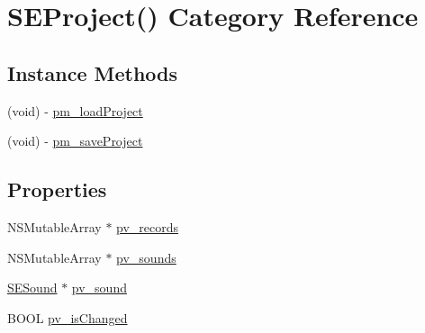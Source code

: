 \hypertarget{category_s_e_project_07_08}{\section{S\-E\-Project() Category Reference}
\label{category_s_e_project_07_08}
}
\subsection*{Instance Methods}
\begin{DoxyCompactItemize}
\item 
(void) -\/ \hyperlink{category_s_e_project_07_08_a2733629176d07d6e49be855ca64bc8e0}{pm\-\_\-load\-Project}
\item 
(void) -\/ \hyperlink{category_s_e_project_07_08_a2754dc82ffc8565940c2b297e638800e}{pm\-\_\-save\-Project}
\end{DoxyCompactItemize}
\subsection*{Properties}
\begin{DoxyCompactItemize}
\item 
N\-S\-Mutable\-Array $\ast$ \hyperlink{category_s_e_project_07_08_ae2c8be64c26691c643438545604ef2e2}{pv\-\_\-records}
\item 
N\-S\-Mutable\-Array $\ast$ \hyperlink{category_s_e_project_07_08_ab8fa4740c3d1a67a81ca45ac849ecaba}{pv\-\_\-sounds}
\item 
\hyperlink{interface_s_e_sound}{S\-E\-Sound} $\ast$ \hyperlink{category_s_e_project_07_08_a081148966077ceef05f8f2c8fcade8bb}{pv\-\_\-sound}
\item 
B\-O\-O\-L \hyperlink{category_s_e_project_07_08_ac3ea8d84f56007c0b810c3d9bdf14192}{pv\-\_\-is\-Changed}
\end{DoxyCompactItemize}


